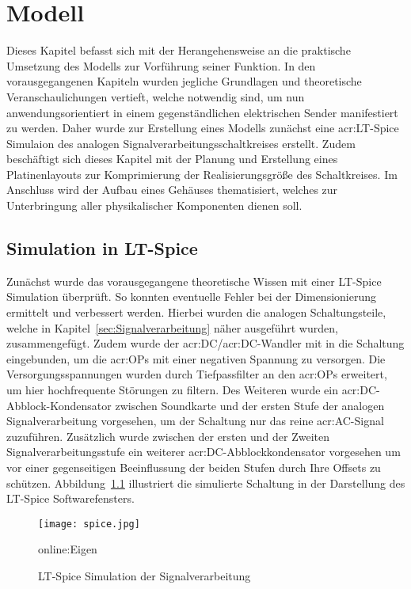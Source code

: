 
\chapter{Modell}
\label{sec:modell}
Dieses Kapitel befasst sich mit der Herangehensweise an die praktische Umsetzung des Modells zur Vorführung seiner Funktion. In den vorausgegangenen Kapiteln wurden jegliche Grundlagen und theoretische Veranschaulichungen vertieft, welche notwendig sind, um nun anwendungsorientiert in einem gegenständlichen elektrischen Sender manifestiert zu werden. Daher wurde zur Erstellung eines Modells zunächst eine \gls{acr:LT}-Spice Simulaion des analogen Signalverarbeitungsschaltkreises erstellt. Zudem beschäftigt sich dieses Kapitel mit der Planung und Erstellung eines Platinenlayouts zur Komprimierung der Realisierungsgröße des Schaltkreises. Im Anschluss wird der Aufbau eines Gehäuses thematisiert, welches zur Unterbringung aller physikalischer Komponenten dienen soll.

\section{Simulation in LT-Spice}
\label{sec:simlt}

Zunächst wurde das vorausgegangene theoretische Wissen mit einer LT-Spice Simulation überprüft. So konnten eventuelle Fehler bei der Dimensionierung ermittelt und verbessert werden. Hierbei wurden die analogen Schaltungsteile, welche in Kapitel~\ref{sec:Signalverarbeitung} näher ausgeführt wurden, zusammengefügt. Zudem wurde der \gls{acr:DC}/\gls{acr:DC}-Wandler mit in die Schaltung eingebunden, um die \gls{acr:OP}s mit einer negativen Spannung zu versorgen. Die Versorgungsspannungen wurden durch Tiefpassfilter an den \gls{acr:OP}s erweitert, um hier hochfrequente Störungen zu filtern. Des Weiteren wurde ein \gls{acr:DC}-Abblock-Kondensator zwischen Soundkarte und der ersten Stufe der analogen Signalverarbeitung vorgesehen, um der Schaltung nur das reine \gls{acr:AC}-Signal zuzuführen. Zusätzlich wurde zwischen der ersten und der Zweiten Signalverarbeitungsstufe ein weiterer \gls{acr:DC}-Abblockkondensator vorgesehen um vor einer gegenseitigen Beeinflussung der beiden Stufen durch Ihre Offsets zu schützen. Abbildung~\ref{fig:spice} illustriert die simulierte Schaltung in der Darstellung des LT-Spice Softwarefensters.

\begin{figure}[H]
	\centering
	\texttt{[image: spice.jpg]}
	\caption[LT-Spice Simulation der Signalverarbeitung]{LT-Spice Simulation der Signalverarbeitung} \gls{online:Eigen}
	\label{fig:spice}
\end{figure}

